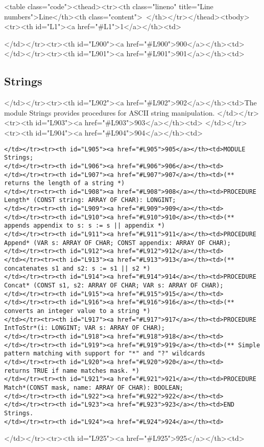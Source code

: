 <table class="code"><thead><tr><th class="lineno" title="Line numbers">Line</th><th class="content"> </th></tr></thead><tbody><tr><th id="L1"><a href="#L1">1</a></th><td>\documentclass[a4paper,11pt]{article}
\begin{document}
</td></tr><tr><th id="L900"><a href="#L900">900</a></th><td>
</td></tr><tr><th id="L901"><a href="#L901">901</a></th><td>\subsection{Strings}
</td></tr><tr><th id="L902"><a href="#L902">902</a></th><td>The module Strings provides procedures for ASCII string manipulation.
</td></tr><tr><th id="L903"><a href="#L903">903</a></th><td>
</td></tr><tr><th id="L904"><a href="#L904">904</a></th><td>\begin{lstlisting}[language=Oberon,frame=none,caption={Strings}]
</td></tr><tr><th id="L905"><a href="#L905">905</a></th><td>MODULE Strings;
</td></tr><tr><th id="L906"><a href="#L906">906</a></th><td>
</td></tr><tr><th id="L907"><a href="#L907">907</a></th><td>(** returns the length of a string *)
</td></tr><tr><th id="L908"><a href="#L908">908</a></th><td>PROCEDURE Length* (CONST string: ARRAY OF CHAR): LONGINT;
</td></tr><tr><th id="L909"><a href="#L909">909</a></th><td>
</td></tr><tr><th id="L910"><a href="#L910">910</a></th><td>(** appends appendix to s: s := s || appendix *)
</td></tr><tr><th id="L911"><a href="#L911">911</a></th><td>PROCEDURE Append* (VAR s: ARRAY OF CHAR; CONST appendix: ARRAY OF CHAR);
</td></tr><tr><th id="L912"><a href="#L912">912</a></th><td>
</td></tr><tr><th id="L913"><a href="#L913">913</a></th><td>(** concatenates s1 and s2: s := s1 || s2 *)
</td></tr><tr><th id="L914"><a href="#L914">914</a></th><td>PROCEDURE Concat* (CONST s1, s2: ARRAY OF CHAR; VAR s: ARRAY OF CHAR);
</td></tr><tr><th id="L915"><a href="#L915">915</a></th><td>
</td></tr><tr><th id="L916"><a href="#L916">916</a></th><td>(** converts an integer value to a string *)
</td></tr><tr><th id="L917"><a href="#L917">917</a></th><td>PROCEDURE IntToStr*(i: LONGINT; VAR s: ARRAY OF CHAR);
</td></tr><tr><th id="L918"><a href="#L918">918</a></th><td>
</td></tr><tr><th id="L919"><a href="#L919">919</a></th><td>(** Simple pattern matching with support for "*" and "?" wildcards
</td></tr><tr><th id="L920"><a href="#L920">920</a></th><td>    returns TRUE if name matches mask. *)
</td></tr><tr><th id="L921"><a href="#L921">921</a></th><td>PROCEDURE Match*(CONST mask, name: ARRAY OF CHAR): BOOLEAN;
</td></tr><tr><th id="L922"><a href="#L922">922</a></th><td>
</td></tr><tr><th id="L923"><a href="#L923">923</a></th><td>END Strings.
</td></tr><tr><th id="L924"><a href="#L924">924</a></th><td>\end{lstlisting}
</td></tr><tr><th id="L925"><a href="#L925">925</a></th><td>
\end{document}
